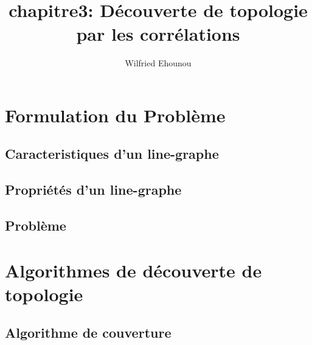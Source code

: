 \documentclass[onecolumn, 12pt]{book}
\title{chapitre3: D\'ecouverte de topologie par les corr\'elations}
\author{Wilfried Ehounou}
\date{\oldstylenums{\today}}
\begin{document}
\maketitle
\section{Formulation du Probl\`eme}

	

	\subsection{Caracteristiques d'un line-graphe}
		

	\subsection{Propri\'et\'es d'un line-graphe}
		

	\subsection{Probl\`eme}
		

\section{Algorithmes de d\'ecouverte de topologie}

%	
	\subsection{Algorithme de couverture}
\end{document}
